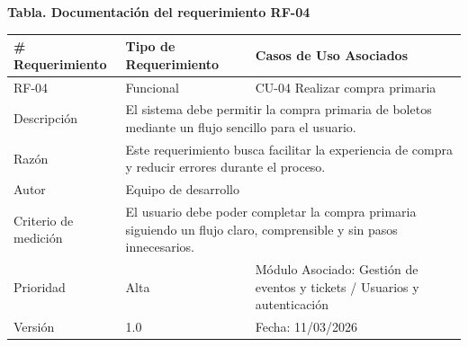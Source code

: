 \documentclass[12pt,letterpaper]{article}
\begin{document}
\noindent
\begin{minipage}{\textwidth}
\centering
\scriptsize
\renewcommand{\arraystretch}{0.9}
\setlength{\tabcolsep}{3pt}
\setlength{\arrayrulewidth}{0.5pt}

\textbf{Tabla. Documentación del requerimiento RF-04}

\vspace{2pt}

\begin{tabularx}{\textwidth}{|p{2.6cm}|X|p{3.4cm}|}
\hline
\# Requerimiento & Tipo de Requerimiento & Casos de Uso Asociados \\ \hline
RF-04 & Funcional & CU-04 Realizar compra primaria \\ \hline
Descripción & \multicolumn{2}{X|}{El sistema debe permitir la compra primaria de boletos mediante un flujo sencillo para el usuario.} \\ \hline
Razón & \multicolumn{2}{X|}{Este requerimiento busca facilitar la experiencia de compra y reducir errores durante el proceso.} \\ \hline
Autor & \multicolumn{2}{X|}{Equipo de desarrollo} \\ \hline
Criterio de medición & \multicolumn{2}{X|}{El usuario debe poder completar la compra primaria siguiendo un flujo claro, comprensible y sin pasos innecesarios.} \\ \hline
Prioridad & Alta & Módulo Asociado: Gestión de eventos y tickets / Usuarios y autenticación \\ \hline
Versión & 1.0 & Fecha: 11/03/2026 \\ \hline
\end{tabularx}
\end{minipage}

\vspace{0.2cm}
\end{document}

